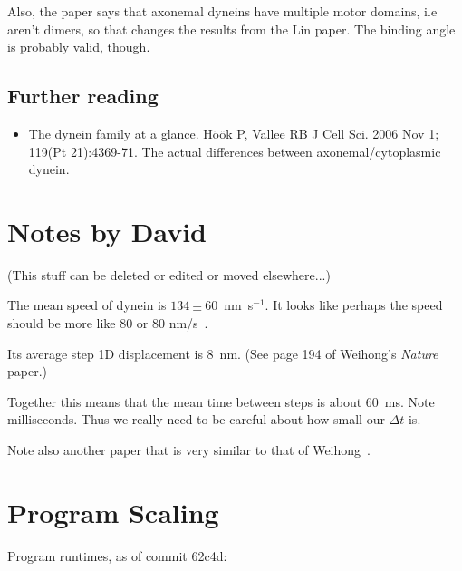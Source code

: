 \documentclass[10pt]{article} %
\begin{document}
Also, the paper says that axonemal dyneins have multiple motor domains, i.e aren't dimers, so that changes the results from the Lin paper. The binding angle is probably valid, though.\\

\subsection{Further reading}
\begin{itemize}
\item The dynein family at a glance. Höök P, Vallee RB J Cell Sci. 2006 Nov 1; 119(Pt 21):4369-71. The actual differences between axonemal/cytoplasmic dynein.
\end{itemize}

\section{Notes by David}
(This stuff can be deleted or edited or moved elsewhere...)

The mean speed of dynein is $134\pm 60$~nm~s$^{-1}$.  It looks like
perhaps the speed should be more like 80 or 80 nm/s~\cite{reck2006single}.

Its average step 1D displacement is 8~nm. (See page 194 of Weihong's \emph{Nature} paper.)

Together this means that the mean time between steps is about 60~ms.
Note milliseconds.  Thus we really need to be careful about how small
our $\Delta t$ is.

Note also another paper that is very similar to that of Weihong~\cite{dewitt2012cytoplasmic}.

\section{Program Scaling}
Program runtimes, as of commit 62c4d:
\end{document}
